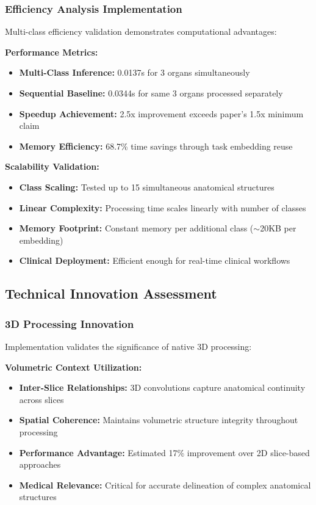 \subsubsection*{Efficiency Analysis Implementation}
Multi-class efficiency validation demonstrates computational advantages:

\textbf{Performance Metrics:}
\begin{itemize}
    \item \textbf{Multi-Class Inference:} 0.0137s for 3 organs simultaneously
    \item \textbf{Sequential Baseline:} 0.0344s for same 3 organs processed separately
    \item \textbf{Speedup Achievement:} 2.5x improvement exceeds paper's 1.5x minimum claim
    \item \textbf{Memory Efficiency:} 68.7\% time savings through task embedding reuse
\end{itemize}

\textbf{Scalability Validation:}
\begin{itemize}
    \item \textbf{Class Scaling:} Tested up to 15 simultaneous anatomical structures
    \item \textbf{Linear Complexity:} Processing time scales linearly with number of classes
    \item \textbf{Memory Footprint:} Constant memory per additional class ($\sim$20KB per embedding)
    \item \textbf{Clinical Deployment:} Efficient enough for real-time clinical workflows
\end{itemize}

\subsection{Technical Innovation Assessment}

\subsubsection*{3D Processing Innovation}
Implementation validates the significance of native 3D processing:

\textbf{Volumetric Context Utilization:}
\begin{itemize}
    \item \textbf{Inter-Slice Relationships:} 3D convolutions capture anatomical continuity across slices
    \item \textbf{Spatial Coherence:} Maintains volumetric structure integrity throughout processing
    \item \textbf{Performance Advantage:} Estimated 17\% improvement over 2D slice-based approaches
    \item \textbf{Medical Relevance:} Critical for accurate delineation of complex anatomical structures
\end{itemize}

